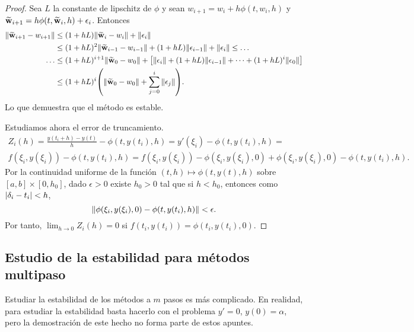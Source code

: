 \begin{proof}
    Sea $L$ la constante de lipschitz de $\phi$ y
    sean $w_{i+1} = w_i + h\phi(t, w_i, h)$ y
    $\vb{\widetilde{w}}_{i+1} = h\phi(t, \vb{\widetilde{w}}_i, h) + \epsilon_i$.
    Entonces
    \begin{align*}
        \norm{\vb{\widetilde{w}}_{i+1} - w_{i+1}} & {} \le
            (1 + hL)\norm{\vb{\widetilde{w}}_i - w_i} + \norm{\epsilon_i} \\
        & \le (1 + hL)^2\norm{\vb{\widetilde{w}}_{i-1} - w_{i-1}}
            + (1 + hL)\norm{\epsilon_{i-1}} + \norm{\epsilon_i} \le \ldots \\
        \ldots & \le (1 + hL)^{i+1}\norm{\vb{\widetilde{w}}_0 - w_0} + \qty[
            \norm{\epsilon_i} + (1 + hL)\norm{\epsilon_{i-1}} + \dots
            + (1 + hL)^i\norm{\epsilon_0}
        ] \\
        & \le (1 + hL)^i\qty(
            \norm{\vb{\widetilde{w}}_0 - w_0} + \sum_{j=0}^i \norm{\epsilon_j}
        ).
    \end{align*}
    Lo que demuestra que el método es estable.

    Estudiamos ahora el error de truncamiento.
    \begin{multline*}
        Z_i(h) = \frac{y(t_i + h) - y(t)}{h} - \phi(t, y(t_i), h) =
        y'(\xi_i) - \phi(t, y(t_i), h) = \\
        f(\xi_i, y(\xi_i)) - \phi(t, y(t_i), h) =
        f(\xi_i, y(\xi_i)) - \phi(\xi_i, y(\xi_i), 0)
            + \phi(\xi_i, y(\xi_i), 0) - \phi(t, y(t_i), h).
    \end{multline*}
    Por la continuidad uniforme de la función
    $(t, h) \mapsto \phi(t, y(t), h)$
    sobre $[a, b] \times [0, h_0]$,
    dado $\epsilon > 0$ existe $h_0 > 0$ tal que si $h < h_0$,
    entonces como $\abs{\delta_i - t_i} < h$,
    \begin{equation*}
        \norm{\phi(\xi_i, y(\xi_i), 0) - \phi(t, y(t_i), h)} < \epsilon.
    \end{equation*}
    Por tanto, $\lim_{h \to 0} Z_i(h) = 0$
    si $f(t_i, y(t_i)) = \phi(t_i, y(t_i), 0)$.
\end{proof}

\subsection{Estudio de la estabilidad para métodos multipaso}

Estudiar la estabilidad de los métodos a $m$ pasos es más complicado.
En realidad, para estudiar la estabilidad basta hacerlo con el problema
$y' = 0$, $y(0) = \alpha$,
pero la demostración de este hecho no forma parte de estos apuntes.

